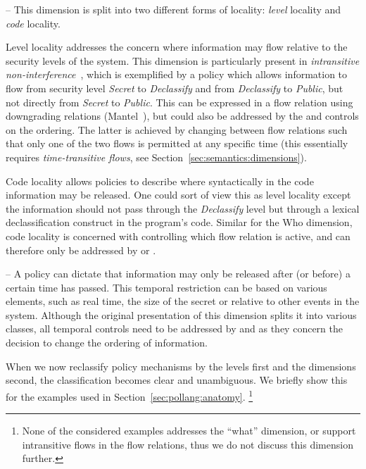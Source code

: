  --
This dimension is split into two different forms of locality: \emph{level} locality and \emph{code} locality.

Level locality addresses the concern where information may flow relative to the security levels of the system.
This dimension is particularly present in \emph{intransitive non-interference}~\cite{Rushby:92}, which is exemplified by a policy which allows information to flow from security level {\it Secret} to {\it Declassify} and from {\it Declassify} to {\it Public}, but not directly from {\it Secret} to {\it Public}.
This can be expressed in a flow relation using downgrading relations (Mantel~\cite{Mantel:FME01}),
but could also be addressed by the \dynamicpol{} and \metapol{} controls on the ordering.
The latter is achieved by changing between flow relations such that only one of the two flows is
permitted at any specific time (this essentially requires \emph{time-transitive flows},
see Section~\ref{sec:semantics:dimensions}).

Code locality allows policies to describe where syntactically in the code information may be released.
One could sort of view this as level locality except the information should not pass through the 
{\it Declassify} level but through a lexical declassification construct in the program's code.
Similar for the Who dimension, code locality is concerned with controlling which flow relation is active, 
and can therefore only be addressed by \dynamicpol{} or \metapol{}.

 --
A policy can dictate that information may only be released after (or before) a certain time has passed.
This temporal restriction can be based on various elements, such as real time, the size of the secret or relative to other events in the system.
Although the original presentation of this dimension splits it into various classes, all temporal controls need to be addressed by \dynamicpol{} and \metapol{} as they concern the decision to change the ordering of information.



When we now reclassify policy mechanisms by the levels first and the dimensions second, 
the classification becomes clear and unambiguous.
We briefly show this for the examples used in Section~\ref{sec:pollang:anatomy}.
\footnote{None of the considered examples addresses the ``what'' dimension, or 
support intransitive flows in the flow relations, thus we do not discuss this dimension further.}

